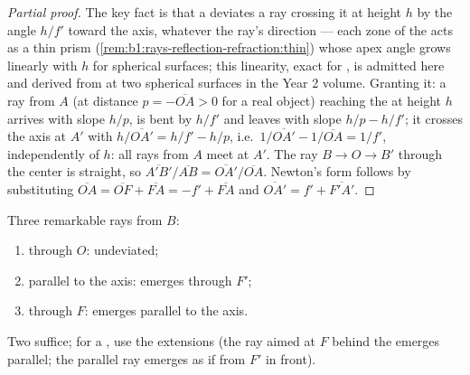 \begin{proof}[Partial proof]
The key fact is that a  deviates a ray crossing it at height
$h$ by the angle $h/f'$ toward the axis, whatever the ray's direction
--- each zone of the  acts as a thin prism (\cref{rem:b1:rays-reflection-refraction:thin})
whose apex angle grows linearly with $h$ for spherical surfaces; this
linearity, exact for , is admitted here and derived from
 at two spherical surfaces in the Year 2 volume. Granting
it: a ray from $A$ (at distance $p = -\overline{OA} > 0$ for a real
object) reaching the  at height $h$ arrives with slope $h/p$, is
bent by $h/f'$ and leaves with slope $h/p - h/f'$; it crosses the axis
at $A'$ with $h/\overline{OA'} = h/f' - h/p$, i.e.\ $1/\overline{OA'}
- 1/\overline{OA} = 1/f'$, independently of $h$: all rays from $A$ meet
at $A'$. The ray $B \to O \to B'$ through the center is straight, so
$\overline{A'B'}/\overline{AB} = \overline{OA'}/\overline{OA}$. Newton's
form follows by substituting $\overline{OA} = \overline{OF} + \overline{FA}
= -f' + \overline{FA}$ and $\overline{OA'} = f' + \overline{F'A'}$.
\end{proof}

\begin{method}\label{met:b1:mirrors-thin-lenses:lensrays}
Three remarkable rays from $B$:
\begin{enumerate}
  \item through $O$: undeviated;
  \item parallel to the axis: emerges through $F'$;
  \item through $F$: emerges parallel to the axis.
\end{enumerate}
Two suffice; for a , use the extensions (the ray aimed at
$F$ behind the  emerges parallel; the parallel ray emerges as if
from $F'$ in front).
\end{method}


